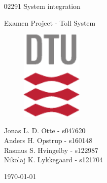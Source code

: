 \begin{titlepage}

\begin{center}
\rule{0pt}{0pt}
\vfill
\vfill

\begin{huge}
02291 System integration\\[0.75ex]
\end{huge}
\begin{LARGE}
Examen Project - Toll System\\
\end{LARGE}
\vfill
\vfill

\begin{figure}[h!]
  \begin{center}
    \includegraphics[width=3cm]{figures/DTUlogo.pdf} 
  \end{center}
\end{figure}

\vfill
\vfill

\vspace*{.5cm}

\begin{center}
Jonas L. D. Otte - s047620\\
Anders H. Opstrup - s160148\\
Rasmus S. Hvingelby - s122987\\
Nikolaj K. Lykkegaard - s121704\\ 
\end{center}

\vspace{.5cm}

\today \\

\vfill
\vfill


\end{center}
\end{titlepage}

\newpage